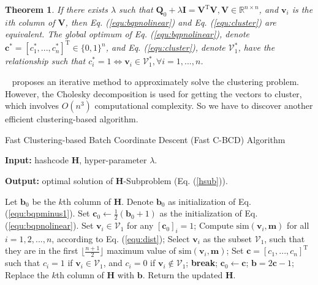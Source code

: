 \documentclass[conference]{IEEEtran}
\newtheorem{thm}{Theorem}
\begin{document}
\begin{thm}
If there exists $\lambda$ such that $\mathbf{Q}_0+\lambda\mathbf{I}=\mathbf{V}^\mathrm{T}\mathbf{V}, \mathbf{V} \in \mathbb{R}^{n \times n}$, and $\mathbf{v}_i$ is the $i$th column of $\mathbf{V}$, then Eq. (\ref{equ:bqpnolinear}) and Eq. (\ref{equ:cluster}) are equivalent. The global optimum of Eq. (\ref{equ:bqpnolinear}), denote $\mathbf{c}^*=[c^*_1,...,c^*_n]^\mathrm{T} \in \{0,1\}^n$, and Eq. (\ref{equ:cluster}), denote $\mathcal{V}^*_1$, have the relationship such that $c^*_i=1 \Leftrightarrow \mathbf{v}_i \in \mathcal{V}^*_1, \forall i=1,...,n$. 
\label{the:cluster}
\end{thm}

~\cite{yang2013new} proposes an iterative method to approximately solve the clustering problem. However, the Cholesky decomposition is used for getting the vectors to cluster, which involves $O(n^3)$ computational complexity. So we have to discover another efficient clustering-based algorithm.

\begin{algorithm}[t]
\small
\caption{Fast Clustering-based Batch Coordinate Descent (Fast C-BCD) Algorithm}
\textbf{Input:} hashcode $\mathbf{H}$, hyper-parameter $\lambda$.

\textbf{Output:} optimal solution of $\mathbf{H}$-Subproblem (Eq. (\ref{hsub})).

\begin{algorithmic}
\STATE Let $\textbf{b}_0$ be the $k$th column of $\mathbf{H}$. Denote $\textbf{b}_0$ as initialization of Eq. (\ref{equ:bqpminus1}).
\STATE Set $\mathbf{c}_0 \gets \frac{1}{2}(\mathbf{b}_0+1)$ as the initialization of Eq. (\ref{equ:bqpnolinear}).
\STATE Set $\mathbf{v}_i \in \mathcal{V}_1$ for any $[\mathbf{c}_0]_i=1$;
\STATE Compute $\mathrm{sim}(\mathbf{v}_i,\mathbf{m})$ for all $i=1,2,...,n$, according to Eq. (\ref{equ:dist});
\STATE Select $\mathbf{v}_i$ as the subset $\mathcal{V}_1$, such that they are in the first $\lfloor \frac{n+1}{2} \rfloor$ maximum value of $\mathrm{sim}(\mathbf{v}_i,\mathbf{m})$;
\STATE Set $\mathbf{c}=[c_1,...,c_n]^\mathrm{T}$ such that $c_i=1$ if $\mathbf{v}_i \in \mathcal{V}_1$, and $c_i=0$ if $\mathbf{v}_i \notin \mathcal{V}_1$;
\STATE \textbf{break};
\ENDIF
\STATE $\mathbf{c}_0 \gets \mathbf{c}$;
\ENDWHILE
\STATE $\mathbf{b}=2\mathbf{c}-1$;
\STATE Replace the $k$th column of $\mathbf{H}$ with $\mathbf{b}$.
\ENDFOR
\STATE Return the updated $\mathbf{H}$.
\end{algorithmic}
\label{hsub_algo}
\end{algorithm}
\end{document}
